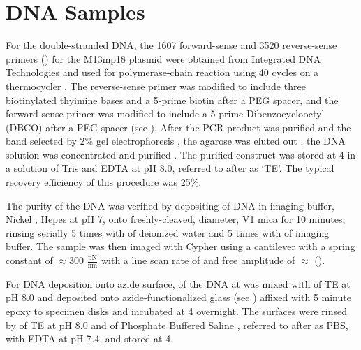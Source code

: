 \section{DNA Samples}

\firstp For the  double-stranded DNA, the 1607 forward-sense and 3520 reverse-sense primers () for the M13mp18 plasmid  were obtained from Integrated DNA Technologies  and used for polymerase-chain reaction  using 40 cycles on a thermocycler . The reverse-sense primer was modified to include three biotinylated thyimine bases and a 5-prime biotin after a PEG spacer, and the forward-sense primer was modified to include a 5-prime Dibenzocyclooctyl (DBCO) after a PEG-spacer (see ). After the PCR product was purified  and the  band selected by 2\% gel electrophoresis , the agarose was eluted out , the DNA solution was concentrated  and purified . The purified construct was stored at 4\degreeC{} in a solution of  Tris  and  EDTA  at pH 8.0, referred to after as `TE'. The typical recovery efficiency of this procedure was 25\%. \pl

The purity of the DNA was verified by depositing  of DNA in imaging buffer,  Nickel ,  Hepes  at pH 7, onto freshly-cleaved,  diameter, V1 mica  for 10 minutes, rinsing serially 5 times with  of deionized water and 5 times with  of imaging buffer. The sample was then imaged with Cypher using a cantilever with a spring constant of $\approx$300 $\frac{\text{pN}}{\text{nm}}$  with a line scan rate of  and free amplitude of $\approx$ ().\pl 

For DNA deposition onto azide surface,  of the DNA at  was mixed with  of TE at pH 8.0 and deposited onto azide-functionalized glass (see ) affixed with 5 minute epoxy  to specimen disks  and incubated at 4\degreeC{} overnight. The surfaces were rinsed by  of TE at pH 8.0 and  of Phosphate Buffered Saline , referred to after as PBS, with  EDTA at pH 7.4, and stored at 4\degreeC{}. 


